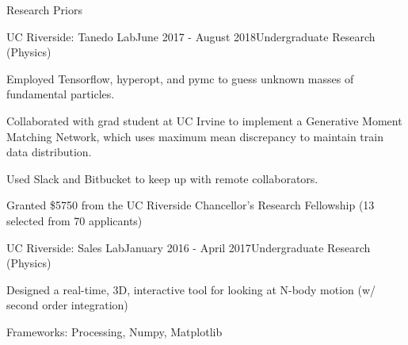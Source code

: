 \documentclass{resume} %
\begin{document}
\begin{rSection}{Research Priors}

\begin{rSubsection}{UC Riverside: Tanedo Lab}{June 2017 - August 2018}{Undergraduate Research (Physics)}{}
\item Employed Tensorflow, hyperopt, and pymc to guess unknown masses of fundamental particles.
\item Collaborated with grad student at UC Irvine to implement a Generative Moment Matching Network, which uses maximum mean discrepancy to maintain train data distribution.
\item Used Slack and Bitbucket to keep up with remote collaborators.
\item Granted \$5750 from the UC Riverside Chancellor's Research Fellowship (13 selected from 70 applicants)
\end{rSubsection}



\begin{rSubsection}{UC Riverside: Sales Lab}{January 2016 - April 2017}{Undergraduate Research (Physics)}{}
\item Designed a real-time, 3D, interactive tool for looking at N-body motion (w/ second order integration)
\item Frameworks: Processing, Numpy, Matplotlib
\end{rSubsection}

\end{rSection}



\end{document}
